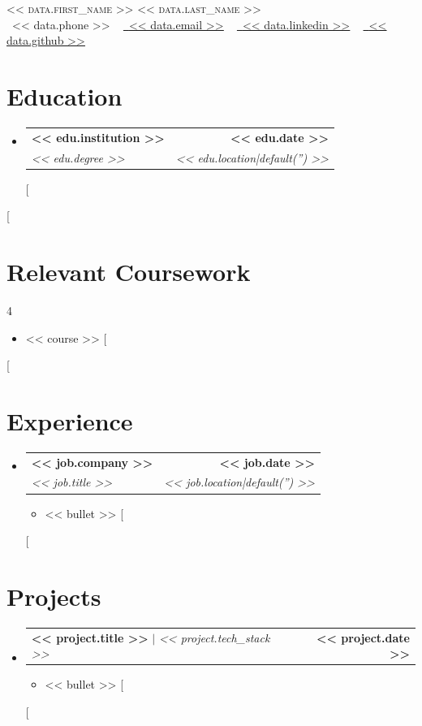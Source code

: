 \documentclass[letterpaper,11pt]{article}
\makeatletter
\newcommand{\resumeItem}[1]{\item\small{{#1 \vspace{-2pt}}}}
\newcommand{\resumeSubheading}[4]{\vspace{-2pt}\item\begin{tabular*}{1.0\textwidth}[t]{l@{\extracolsep{\fill}}r}\textbf{#1} & \textbf{\small #2} \\\textit{\small#3} & \textit{\small #4} \\\end{tabular*}\vspace{-7pt}}
\newcommand{\resumeProjectHeading}[2]{\item\begin{tabular*}{1.001\textwidth}{l@{\extracolsep{\fill}}r}\small#1 & \textbf{\small #2}\\\end{tabular*}\vspace{-7pt}}
\newcommand{\resumeSubHeadingListStart}{\begin{itemize}[leftmargin=0.0in, label={}]}
\newcommand{\resumeSubHeadingListEnd}{\end{itemize}}
\newcommand{\resumeItemListStart}{\begin{itemize}}
\newcommand{\resumeItemListEnd}{\end{itemize}\vspace{-5pt}}
\makeatother
\begin{document}
\begin{center}
    {\Huge \scshape << data.first_name >> << data.last_name >>} \\ \vspace{1pt}
    \small \raisebox{-0.1\height}\faPhone\ << data.phone >> ~ 
    \href{mailto:<< data.email >>}{\raisebox{-0.2\height}\faEnvelope\ \underline{<< data.email >>}} ~ 
    \href{https://<< data.linkedin >>}{\raisebox{-0.2\height}\faLinkedin\ \underline{<< data.linkedin >>}} ~ 
    \href{https://<< data.github >>}{\raisebox{-0.2\height}\faGithub\ \underline{<< data.github >>}}
\end{center}

\section{Education}
  \resumeSubHeadingListStart
    [%
    \resumeSubheading{<< edu.institution >>}{<< edu.date >>}{<< edu.degree >>}{<< edu.location|default('') >>}
    [%
  \resumeSubHeadingListEnd

[%
\section{Relevant Coursework}
    \begin{multicols}{4}
        \begin{itemize}[itemsep=-5pt, parsep=3pt]
            [%
            \item\small << course >>
            [%
        \end{itemize}
    \end{multicols}
    \vspace*{2.0\multicolsep}
[%

\section{Experience}
  \resumeSubHeadingListStart
    [%
    \resumeSubheading{<< job.company >>}{<< job.date >>}{<< job.title >>}{<< job.location|default('') >>}
      \resumeItemListStart
        [%
        \resumeItem{<< bullet >>}
        [%
      \resumeItemListEnd
    [%
  \resumeSubHeadingListEnd

\section{Projects}
    \resumeSubHeadingListStart
      [%
      \resumeProjectHeading{\textbf{<< project.title >>} $|$ \emph{<< project.tech_stack >>}}{<< project.date >>}
          \resumeItemListStart
            [%
            \resumeItem{<< bullet >>}
            [%
          \resumeItemListEnd 
          \vspace{-13pt}
      [%
    \resumeSubHeadingListEnd
\end{document}
